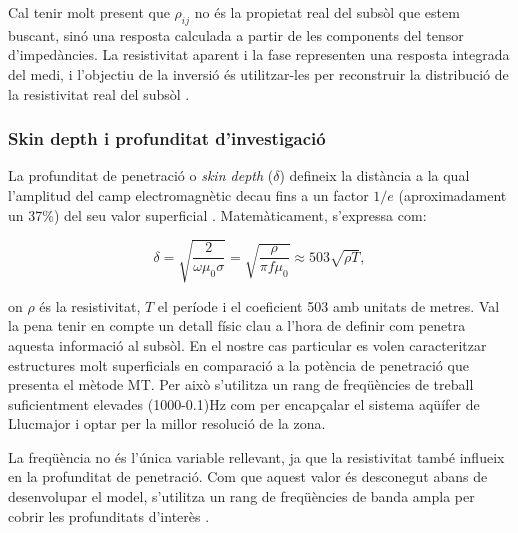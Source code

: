 \documentclass[11pt,a4paper,oneside]{article}
\begin{document}
\vspace{5pt}

Cal tenir molt present que $\rho_{ij}$ no és la propietat real del subsòl que estem buscant, sinó una resposta calculada a partir de les components del tensor d’impedàncies. La resistivitat aparent i la fase representen una resposta integrada del medi, i l'objectiu de la inversió és utilitzar-les per reconstruir la distribució de la resistivitat real del subsòl \citep{chavejones2012}.

\vspace{5pt}

\subsubsection{Skin depth i profunditat d'investigació}

La profunditat de penetració o \emph{skin depth} ($\delta$) defineix la distància a la qual l'amplitud del camp electromagnètic decau fins a un factor $1/e$ (aproximadament un 37\%) del seu valor superficial \citep{chavejones2012}. Matemàticament, s'expressa com: 
\vspace{5pt}


\begin{equation}
    \delta = \sqrt{\frac{2}{\omega \mu_0 \sigma}} = \sqrt{\frac{\rho}{\pi f \mu_0}} \approx 503 \sqrt{\rho T},
    \label{eq:15}
\end{equation}

\vspace{5pt}

\noindent
on $\rho$ és la resistivitat, $T$ el període i el coeficient 503 amb unitats de metres. Val la pena tenir en compte un detall físic clau a l'hora de definir com penetra aquesta informació al subsòl. En el nostre cas particular es volen caracteritzar estructures molt superficials en comparació a la potència de penetració que presenta el mètode MT. Per això s’utilitza un rang de freqüències de treball suficientment elevades (1000-0.1)Hz com per encapçalar el sistema aqüífer de Llucmajor i optar per la millor resolució de la zona.

\vspace{5pt}

La freqüència no és l'única variable rellevant, ja que la resistivitat també influeix en la profunditat de penetració. Com que aquest valor és desconegut abans de desenvolupar el model, s’utilitza un rang de freqüències de banda ampla per cobrir les profunditats d'interès \citep{chavejones2012}.
\end{document}
